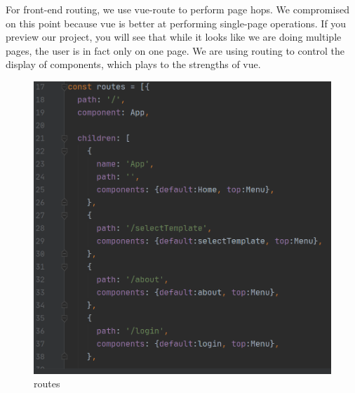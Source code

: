 \documentclass[11pt]{article}
\begin{document}
\begin{spacing}{1.0}
	For front-end routing, we use vue-route to perform page hops. We compromised on this point because vue is better at performing single-page operations. If you preview our project, you will see that while it looks like we are doing multiple pages, the user is in fact only on one page. We are using routing to control the display of components, which plays to the strengths of vue.
	\begin{figure}[H]
	\centering
	\includegraphics[scale=.3]{figures/routes.png}
	\caption{routes}
	\label{fig:8}
\end{figure}
	

\end{spacing}
\end{document}

